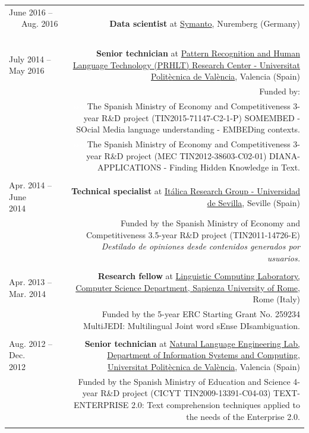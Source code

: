 \documentclass[10pt]{article}
\begin{document}
\begin{tabular}{L!{\VRule}R}
June 2016 -- ~~~Aug. 2016 ~~&{\textbf{Data scientist} at \href{https://www.symanto.com/}{Symanto}, Nuremberg (Germany)}\\&\\

July 2014 -- May 2016 ~~&{\textbf{Senior technician} at \href{http://www.prhlt.upv.es/}{Pattern Recognition and Human Language Technology (PRHLT) Research Center - Universitat Polit{\`e}cnica de Val{\`e}ncia}, Valencia (Spain)}\\
&\scriptsize{Funded by:}\\
&\scriptsize{\textcolor{white}{ssss}The Spanish Ministry of Economy and Competitiveness 3-year R\&D project (TIN2015-71147-C2-1-P) SOMEMBED - SOcial Media language 
understanding - EMBEDing contexts.}\\
&\scriptsize{\textcolor{white}{ssss}The Spanish Ministry of Economy and Competitiveness 3-year R\&D project (MEC TIN2012-38603-C02-01) DIANA-APPLICATIONS - Finding Hidden Knowledge 
in Text.}\\&\\

Apr. 2014 -- June 2014~~~~&{\textbf{Technical specialist} at \href{http://www.lsi.us.es/italica/}{It{\'a}lica Research Group - Universidad de Sevilla}, Seville (Spain)}\\
&\scriptsize{Funded by the Spanish Ministry of Economy and Competitiveness 3.5-year R\&D project (TIN2011-14726-E) \emph{Destilado de opiniones desde contenidos generados por 
usuarios.}}\\&\\
 
Apr. 2013 -- Mar. 2014 ~~&{\textbf{Research fellow} at \href{http://lcl.uniroma1.it/index.html}{Linguistic Computing Laboratory, Computer Science Department, Sapienza University of Rome}, Rome (Italy)}\\
&\scriptsize{Funded by the 5-year ERC Starting Grant No. 259234 MultiJEDI: Multilingual Joint word sEnse DIsambiguation.}\\&\\

Aug. 2012 -- Dec. 2012~~~~&{\textbf{Senior technician} at \href{http://users.dsic.upv.es/grupos/nle/}{Natural Language Engineering Lab, Department of Information Systems and Computing, Universitat Polit{\`e}cnica de Val{\`e}ncia}, Valencia (Spain)}\\
&\scriptsize{Funded by the Spanish Ministry of Education and Science 4-year R\&D project (CICYT TIN2009-13391-C04-03) TEXT-ENTERPRISE 2.0: Text comprehension techniques
applied to the needs of the Enterprise 2.0.}\\&\\
\end{tabular}
\end{document}
